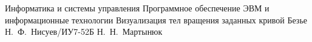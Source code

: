 \makecourseworktitle
    {Информатика и системы управления}
    {Программное обеспечение ЭВМ и информационные технологии}
    {Визуализация тел вращения заданных кривой Безье}
    {Н.~Ф.~Нисуев/ИУ7-52Б}
    {Н.~Н.~Мартынюк}
    { }
